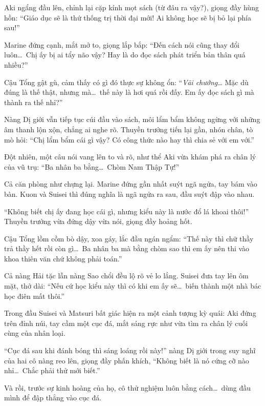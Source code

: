 \documentclass[../main.tex]{subfiles}
\begin{document}
Aki ngẩng đầu lên, chỉnh lại cặp kính mọt sách (từ đâu ra vậy?), giọng đầy hùng hồn: ``Giáo dục sẽ là thứ thống trị thời đại mới! Ai không học sẽ bị bỏ lại phía sau!''

Marine đứng cạnh, mắt mở to, giọng lắp bắp: ``Đến cách nói cũng thay đổi luôn\dots\ Chị ấy bị ai tẩy não vậy? Hay là do đọc sách phát triển bản thân quá nhiều?''

Cậu Tổng gật gù, cảm thấy có gì đó thực sự không ổn: ``\textit{Vãi chưởng\dots} Mặc dù đúng là thế thật, nhưng mà\dots\ thế này là hơi quá rồi đấy. Em ấy đọc sách gì mà thành ra thế nhỉ?''

Nàng Dị giới vẫn tiếp tục cúi đầu vào sách, môi lẩm bẩm không ngừng với những âm thanh lộn xộn, chẳng ai nghe rõ. Thuyền trưởng tiến lại gần, nhón chân, tò mò hỏi: ``Chị lẩm bẩm cái gì vậy? Có công thức nào hay thì chia sẻ với em với.''

Đột nhiên, một câu nói vang lên to và rõ, như thể Aki vừa khám phá ra chân lý của vũ trụ: ``Ba nhân ba bằng\dots\ Chòm Nam Thập Tự!''


Cả căn phòng như chựng lại. Marine đứng gần nhất suýt ngã ngửa, tay bám vào bàn. Kuon và Suisei thì đúng nghĩa là ngã ngửa ra sau, đầu suýt đập vào nhau.

``Không biết chị ấy đang học cái gì, nhưng kiểu này là nước đổ lá khoai thôi!'' Thuyền trưởng vừa đứng dậy vừa nói, giọng đầy hoảng hốt.

Cậu Tổng lồm cồm bò dậy, xoa gáy, lắc đầu ngán ngẩm: ``Thế này thì chữ thầy trả thầy hết rồi còn gì\dots\ Ba nhân ba mà bằng chòm sao thì em ấy nên thi vào khoa thiên văn chứ không phải toán.''

Cả nàng Hải tặc lẫn nàng Sao chổi đều lộ rõ vẻ lo lắng. Suisei đưa tay lên ôm mặt, thở dài: ``Nếu cứ học kiểu này thì có khi em ấy sẽ\dots\ biến thành một nhà bác học điên mất thôi.''


Trong đầu Suisei và Matsuri bất giác hiện ra một cảnh tượng kỳ quái: Aki đứng trên đỉnh núi, tay cầm một cục đá, mắt sáng rực như vừa tìm ra chân lý cuối cùng của nhân loại.

``Cục đá sau khi đánh bóng thì sáng loáng rồi này!'' nàng Dị giới trong suy nghĩ của hai cô nàng reo lên, giọng đầy phấn khích, ``Không biết là nó cứng cỡ nào nhỉ\dots\ Chắc phải thử mới biết.''

Và rồi, trước sự kinh hoàng của họ, cô thử nghiệm luôn bằng cách\dots\ dùng đầu mình để đập thẳng vào cục đá.
\end{document}

